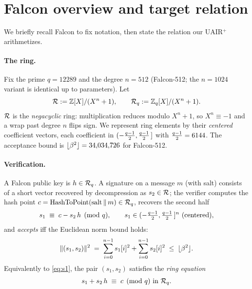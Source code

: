 \section{Falcon overview and target relation}\label{sec:overview}

We briefly recall Falcon to fix notation, then state the relation our
UAIR$^+$ arithmetizes.

\paragraph{The ring.}
Fix the prime $q = 12289$ and the degree $n = 512$ (Falcon-512; the
$n=1024$ variant is identical up to parameters). Let
\[
  \mathcal{R} := \mathbb{Z}[X]/(X^n+1), \qquad \mathcal{R}_q := \mathbb{Z}_q[X]/(X^n+1).
\]
$\mathcal{R}$ is the \emph{negacyclic} ring: multiplication reduces modulo
$X^n+1$, so $X^n \equiv -1$ and a wrap past degree $n$ flips sign. We
represent ring elements by their \emph{centered} coefficient vectors,
each coefficient in $(-\tfrac{q-1}{2}, \tfrac{q-1}{2}\,]$ with $\tfrac{q-1}{2} = 6144$. The
acceptance bound is $\lfloor \beta^2 \rfloor = 34{,}034{,}726$ for Falcon-512.

\paragraph{Verification.}
A Falcon public key is $h \in \mathcal{R}_q$. A signature on a message $m$ (with
salt) consists of a short vector recovered by decompression as
$s_2 \in \mathcal{R}$; the verifier computes the hash point
$c = \operatorname{HashToPoint}(\text{salt}\,\Vert\,m) \in \mathcal{R}_q$, recovers the second
half
\begin{equation}\label{eq:s1}
  s_1 \;\equiv\; c - s_2\, h \pmod{q}, \qquad
  s_1 \in (-\tfrac{q-1}{2}, \tfrac{q-1}{2}\,]^n \text{ (centered)},
\end{equation}
and \emph{accepts} iff the Euclidean norm bound holds:
\begin{equation}\label{eq:norm}
  \lVert (s_1, s_2) \rVert^2
  \;=\; \sum_{i=0}^{n-1} s_1[i]^2 + \sum_{i=0}^{n-1} s_2[i]^2
  \;\le\; \lfloor \beta^2 \rfloor .
\end{equation}
Equivalently to \cref{eq:s1}, the pair $(s_1, s_2)$ satisfies the
\emph{ring equation}
\begin{equation}\label{eq:ring}
  s_1 + s_2\, h \;\equiv\; c \pmod{q}\ \text{in } \mathcal{R}_q .
\end{equation}

